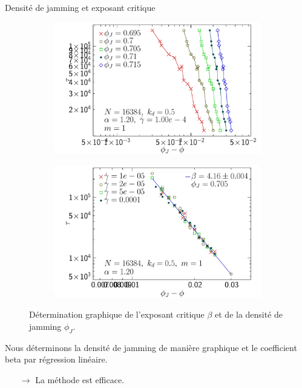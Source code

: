 \documentclass{beamer}
\begin{document}
\begin{frame}{Densité de jamming et exposant critique}

\begin{figure}[h!]
\centering
    \begin{subfigure}[t]{0.49\textwidth}
        \centering
        \includegraphics[width=\textwidth]{figures/figs/tau_dphi_16384_GDh100_EL120}
    \end{subfigure}
    \hfill
    \begin{subfigure}[t]{0.49\textwidth}
        \centering
        \includegraphics[width=\textwidth]{figures/figs/tau_dphi_16384_PJ70500_EL120}
    \end{subfigure}
    \caption{Détermination graphique de l'exposant critique $\beta$ et de la densité de jamming $\phi_J$.}
\end{figure}
Nous déterminons la densité de jamming de manière graphique et le coefficient beta par régression linéaire.
\begin{itemize}
    \item[$\rightarrow$] La méthode est efficace.
\end{itemize}

\end{frame}
\end{document}
